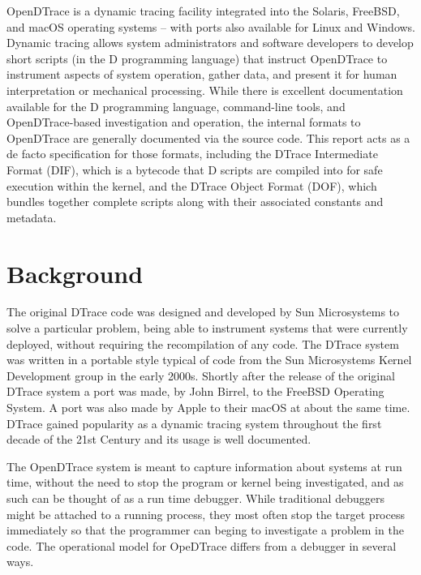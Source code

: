 OpenDTrace is a dynamic tracing facility integrated into the Solaris,
FreeBSD, and macOS operating systems -- with ports also available for
Linux and Windows.  Dynamic tracing allows system administrators and
software developers to develop short scripts (in the D programming
language) that instruct OpenDTrace to instrument aspects of system
operation, gather data, and present it for human interpretation or
mechanical processing.  While there is excellent documentation
available for the D programming language, command-line tools, and
OpenDTrace-based investigation and operation, the internal formats to
OpenDTrace are generally documented via the source code.  This report
acts as a de facto specification for those formats, including the
DTrace Intermediate Format (DIF), which is a bytecode that D scripts
are compiled into for safe execution within the kernel, and the DTrace
Object Format (DOF), which bundles together complete scripts along
with their associated constants and metadata.

\section{Background}

The original DTrace code was designed and developed by Sun
Microsystems to solve a particular problem, being able to instrument
systems that were currently deployed, without requiring the
recompilation of any code\cite{DTrace2004}.  The DTrace system was
written in a portable style typical of code from the Sun Microsystems
Kernel Development group in the early 2000s.  Shortly after the
release of the original DTrace system a port was made, by John Birrel,
to the FreeBSD Operating System.  A port was also made by Apple to
their macOS at about the same time.  DTrace gained popularity as a
dynamic tracing system throughout the first decade of the 21st Century
and its usage is well
documented\cite{mckusick2014design}\cite{Microsystems2008a}\cite{Gregg:2011:DDT:1971960}.

The OpenDTrace system is meant to capture information about systems at
run time, without the need to stop the program or kernel being
investigated, and as such can be thought of as a run time debugger.
While traditional debuggers might be attached to a running process,
they most often stop the target process immediately so that the
programmer can beging to investigate a problem in the code.  The
operational model for OpeDTrace differs from a debugger in several
ways.

